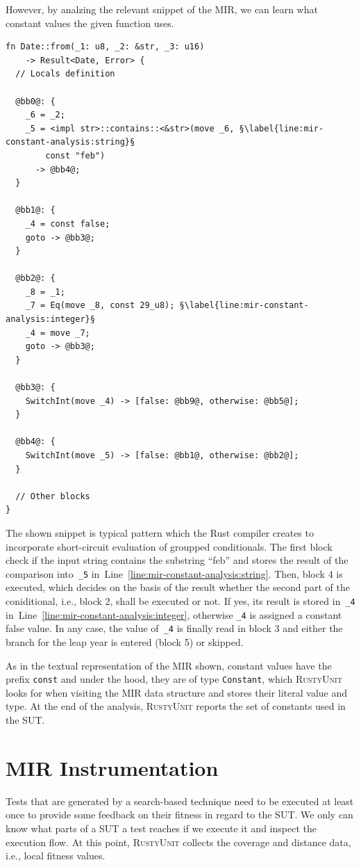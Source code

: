 \documentclass[paper=a4,%
  twoside,%
  BCOR4mm,%
  abstract=true,%
  toc=bibliography,%
  chapterprefix=true,%
  toc=bibliographynumbered,%
  open=right,%
  english,%
  pagesize=pdftex]{scrreprt}
\newcommand{\tech}{\textsc{RustyUnit}\xspace}
\newcommand{\mir}{\ac{MIR}\xspace}
\newcommand{\sut}{\ac{SUT}\xspace}
\begin{document}
However, by analzing the relevant snippet of the \mir, we can learn what constant values the given function uses.
\begin{lstlisting}[language={MIR}, style=boxed, caption={}, label={lst:mir-constant-analysis}, escapechar=§]
fn Date::from(_1: u8, _2: &str, _3: u16)
    -> Result<Date, Error> {
  // Locals definition

  @bb0@: {
    _6 = _2;
    _5 = <impl str>::contains::<&str>(move _6, §\label{line:mir-constant-analysis:string}§
        const "feb")
      -> @bb4@;
  }

  @bb1@: {
    _4 = const false;
    goto -> @bb3@;
  }

  @bb2@: {
    _8 = _1;
    _7 = Eq(move _8, const 29_u8); §\label{line:mir-constant-analysis:integer}§
    _4 = move _7;
    goto -> @bb3@;
  }

  @bb3@: {
    SwitchInt(move _4) -> [false: @bb9@, otherwise: @bb5@];
  }

  @bb4@: {
    SwitchInt(move _5) -> [false: @bb1@, otherwise: @bb2@];
  }

  // Other blocks
}
\end{lstlisting}

The shown snippet is typical pattern which the Rust compiler creates to incorporate short-circuit evaluation of groupped conditionals. The first block check if the input string contains the substring ``feb'' and stores the result of the comparison into~\texttt{\string_5} in~Line~\ref{line:mir-constant-analysis:string}. Then, block 4 is executed, which decides on the basis of the result whether the second part of the coniditional, i.e., block 2, shall be executed or not. If yes, its result is stored in~\texttt{\string_4} in~Line~\ref{line:mir-constant-analysis:integer}, otherwise \texttt{\string_4} is assigned a constant false value. In any case, the value of~\texttt{\string_4} is finally read in block 3 and either the branch for the leap year is entered (block 5) or skipped.

As in the textual representation of the \mir shown, constant values have the prefix \texttt{const} and under the hood, they are of type \texttt{Constant}, which \tech looks for when visiting the \mir data structure and stores their literal value and type. At the end of the analysis, \tech reports the set of constants used in the \sut.

\section{MIR Instrumentation}
Tests that are generated by a search-based technique need to be executed at least once to provide some feedback on their fitness in regard to the \sut. We only can know what parts of a \sut a test reaches if we execute it and inspect the execution flow. At this point, \tech collects the coverage and distance data, i.e., local fitness values.
\end{document}
